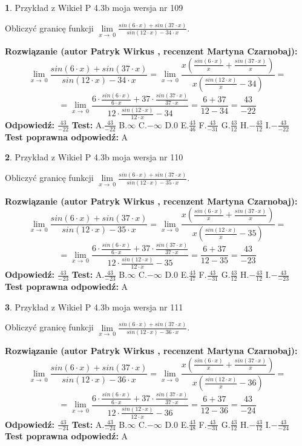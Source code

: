 \documentclass[12pt, a4paper]{article}
\theoremstyle{definition} %
\newtheorem{zad}{}
\newcommand{\zadStart}[1]{\begin{zad}#1\newline}
\newcommand{\zadStop}{\end{zad}}
\newcommand{\rozwStart}[2]{\noindent \textbf{Rozwiązanie (autor #1 , recenzent #2): }\newline}
\newcommand{\rozwStop}{\newline}
\newcommand{\odpStart}{\noindent \textbf{Odpowiedź:}\newline}
\newcommand{\odpStop}{\newline}
\newcommand{\testStart}{\noindent \textbf{Test:}\newline}
\newcommand{\testStop}{\newline}
\newcommand{\kluczStart}{\noindent \textbf{Test poprawna odpowiedź:}\newline}
\newcommand{\kluczStop}{\newline}
\begin{document}
\zadStart{Przykład z Wikieł P 4.3b moja wersja nr 109}


Obliczyć granicę funkcji $\lim\limits_{x\to\ 0}\frac{sin(6 \cdot x)+sin(37 \cdot x)}{sin(12 \cdot x)-34 \cdot x}$.
\zadStop
\rozwStart{Patryk Wirkus}{Martyna Czarnobaj}
$$\lim\limits_{x\to\ 0}\frac{sin(6 \cdot x)+sin(37 \cdot x)}{sin(12 \cdot x)-34 \cdot x}=\lim\limits_{x\to\ 0}\frac{x(\frac{sin(6 \cdot x)}{x}+\frac{sin(37 \cdot x)}{x})}{x(\frac{sin(12 \cdot x)}{x}-34)}=$$
$$=\lim\limits_{x\to\ 0}\frac{6 \cdot \frac{sin(6 \cdot x)}{6 \cdot x}+37 \cdot \frac{sin(37 \cdot x)}{37 \cdot x}}{12 \cdot \frac{sin(12 \cdot x)}{12 \cdot x}-34}=\frac{6+37}{12-34} = \frac{43}{-22}$$
\rozwStop
\odpStart
$\frac{43}{-22}$
\odpStop
\testStart
A.$\frac{43}{-22}$
B.$\infty$
C.$-\infty$
D.$0$
E.$\frac{43}{46}$
F.$\frac{43}{-31}$
G.$\frac{43}{12}$
H.$-\frac{43}{12}$
I.$-\frac{43}{-22}$
\testStop
\kluczStart
A
\kluczStop



\zadStart{Przykład z Wikieł P 4.3b moja wersja nr 110}


Obliczyć granicę funkcji $\lim\limits_{x\to\ 0}\frac{sin(6 \cdot x)+sin(37 \cdot x)}{sin(12 \cdot x)-35 \cdot x}$.
\zadStop
\rozwStart{Patryk Wirkus}{Martyna Czarnobaj}
$$\lim\limits_{x\to\ 0}\frac{sin(6 \cdot x)+sin(37 \cdot x)}{sin(12 \cdot x)-35 \cdot x}=\lim\limits_{x\to\ 0}\frac{x(\frac{sin(6 \cdot x)}{x}+\frac{sin(37 \cdot x)}{x})}{x(\frac{sin(12 \cdot x)}{x}-35)}=$$
$$=\lim\limits_{x\to\ 0}\frac{6 \cdot \frac{sin(6 \cdot x)}{6 \cdot x}+37 \cdot \frac{sin(37 \cdot x)}{37 \cdot x}}{12 \cdot \frac{sin(12 \cdot x)}{12 \cdot x}-35}=\frac{6+37}{12-35} = \frac{43}{-23}$$
\rozwStop
\odpStart
$\frac{43}{-23}$
\odpStop
\testStart
A.$\frac{43}{-23}$
B.$\infty$
C.$-\infty$
D.$0$
E.$\frac{43}{47}$
F.$\frac{43}{-31}$
G.$\frac{43}{12}$
H.$-\frac{43}{12}$
I.$-\frac{43}{-23}$
\testStop
\kluczStart
A
\kluczStop



\zadStart{Przykład z Wikieł P 4.3b moja wersja nr 111}


Obliczyć granicę funkcji $\lim\limits_{x\to\ 0}\frac{sin(6 \cdot x)+sin(37 \cdot x)}{sin(12 \cdot x)-36 \cdot x}$.
\zadStop
\rozwStart{Patryk Wirkus}{Martyna Czarnobaj}
$$\lim\limits_{x\to\ 0}\frac{sin(6 \cdot x)+sin(37 \cdot x)}{sin(12 \cdot x)-36 \cdot x}=\lim\limits_{x\to\ 0}\frac{x(\frac{sin(6 \cdot x)}{x}+\frac{sin(37 \cdot x)}{x})}{x(\frac{sin(12 \cdot x)}{x}-36)}=$$
$$=\lim\limits_{x\to\ 0}\frac{6 \cdot \frac{sin(6 \cdot x)}{6 \cdot x}+37 \cdot \frac{sin(37 \cdot x)}{37 \cdot x}}{12 \cdot \frac{sin(12 \cdot x)}{12 \cdot x}-36}=\frac{6+37}{12-36} = \frac{43}{-24}$$
\rozwStop
\odpStart
$\frac{43}{-24}$
\odpStop
\testStart
A.$\frac{43}{-24}$
B.$\infty$
C.$-\infty$
D.$0$
E.$\frac{43}{48}$
F.$\frac{43}{-31}$
G.$\frac{43}{12}$
H.$-\frac{43}{12}$
I.$-\frac{43}{-24}$
\testStop
\kluczStart
A
\kluczStop
\end{document}
